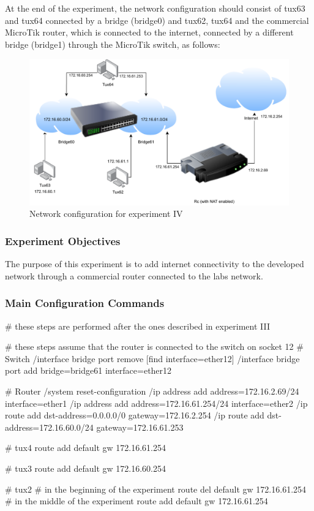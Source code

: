 \documentclass[11pt,a4paper,twocolumn]{article}
\begin{document}
At the end of the experiment, the network configuration should consist of tux63 and tux64 connected by a bridge (bridge0) and tux62, tux64 and the commercial MicroTik router, which is connected to the internet, connected by a different bridge (bridge1) through the MicroTik switch, as follows:

\begin{figure}[H]
    \centering
    \includegraphics[scale=0.4]{experiment4}
    \caption{Network configuration for experiment IV}
\end{figure}

\subsubsection{Experiment Objectives}

The purpose of this experiment is to add internet connectivity to the developed network through a commercial router connected to the labs network.

\subsubsection{Main Configuration Commands}

\begin{code-bash}
# these steps are performed after the ones described in experiment III

# these steps assume that the router is connected to the switch on socket 12
# Switch
/interface bridge port remove [find interface=ether12]
/interface bridge port add bridge=bridge61 interface=ether12

# Router
/system reset-configuration
/ip address add address=172.16.2.69/24 interface=ether1
/ip address add address=172.16.61.254/24 interface=ether2
/ip route add dst-address=0.0.0.0/0 gateway=172.16.2.254
/ip route add dst-address=172.16.60.0/24 gateway=172.16.61.253

# tux4
route add default gw 172.16.61.254

# tux3
route add default gw 172.16.60.254

# tux2
# in the beginning of the experiment
route del default gw 172.16.61.254
# in the middle of the experiment
route add default gw 172.16.61.254

\end{code-bash}
\end{document}
